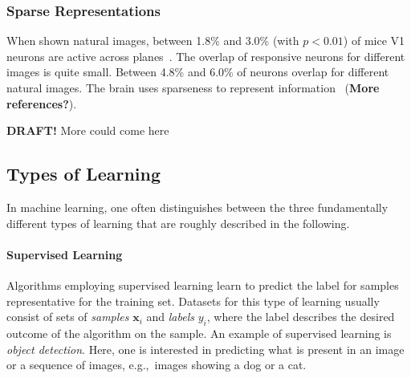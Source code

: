 \subsubsection{Sparse Representations}\label{subsubsec:sparse_representations}

When shown natural images, between 1.8\% and 3.0\% (with $p < 0.01$) of mice \ac{V1} neurons are active across planes~\citep{yoshida2020natural}.
The overlap of responsive neurons for different images is quite small.
Between 4.8\% and 6.0\% of neurons overlap for different natural images.
The brain uses sparseness to represent information~\citep{yoshida2020natural} (\textbf{More references?}).

\textbf{DRAFT!} More could come here

\subsection{Types of Learning}\label{subsec:types-of-learning}

In machine learning, one often distinguishes between the three fundamentally different types of learning that are roughly described in the following.

\paragraph{Supervised Learning}
Algorithms employing supervised learning learn to predict the label for samples representative for the training set.
Datasets for this type of learning usually consist of sets of \textit{samples} $\bm{x}_i$ and \textit{labels} $y_i$, where the label describes the desired outcome of the algorithm on the sample.
An example of supervised learning is \textit{object detection}.
Here, one is interested in predicting what is present in an image or a sequence of images, e.g.,~images showing a dog or a cat.

